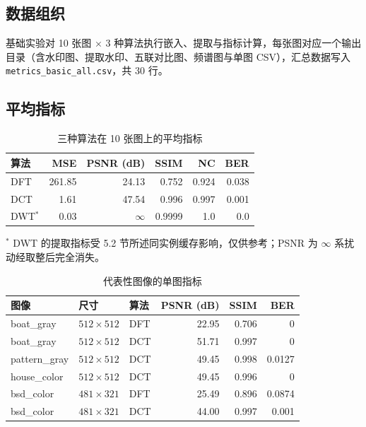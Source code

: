 \documentclass[11pt]{ctexart}
\begin{document}
\subsection{数据组织}

基础实验对 10 张图 $\times$ 3 种算法执行嵌入、提取与指标计算，每张图对应一个输出目录（含水印图、提取水印、五联对比图、频谱图与单图 CSV），汇总数据写入 \texttt{metrics\_basic\_all.csv}，共 30 行。

\subsection{平均指标}

\begin{table}[H]
  \centering
  \caption{三种算法在 10 张图上的平均指标}
  \label{tab:basic-avg}
  \begin{tabular}{lrrrrr}
    \toprule
    算法 & MSE & PSNR (dB) & SSIM & NC & BER \\
    \midrule
    DFT & 261.85 & 24.13 & 0.752 & 0.924 & 0.038 \\
    DCT & 1.61 & 47.54 & 0.996 & 0.997 & 0.001 \\
    DWT$^*$ & 0.03 & $\infty$ & 0.9999 & 1.0 & 0.0 \\
    \bottomrule
  \end{tabular}

  \vspace{4pt}
  {\footnotesize $^*$ DWT 的提取指标受 5.2 节所述同实例缓存影响，仅供参考；PSNR 为 $\infty$ 系扰动经取整后完全消失。}
\end{table}

\begin{table}[H]
  \centering
  \caption{代表性图像的单图指标}
  \label{tab:basic-single}
  \begin{tabular}{lllrrr}
    \toprule
    图像 & 尺寸 & 算法 & PSNR (dB) & SSIM & BER \\
    \midrule
    boat\_gray & $512\times512$ & DFT & 22.95 & 0.706 & 0 \\
    boat\_gray & $512\times512$ & DCT & 51.71 & 0.997 & 0 \\
    pattern\_gray & $512\times512$ & DCT & 49.45 & 0.998 & 0.0127 \\
    house\_color & $512\times512$ & DCT & 49.45 & 0.996 & 0 \\
    bsd\_color & $481\times321$ & DFT & 25.49 & 0.896 & 0.0874 \\
    bsd\_color & $481\times321$ & DCT & 44.00 & 0.997 & 0.001 \\
    \bottomrule
  \end{tabular}
\end{table}
\end{document}
